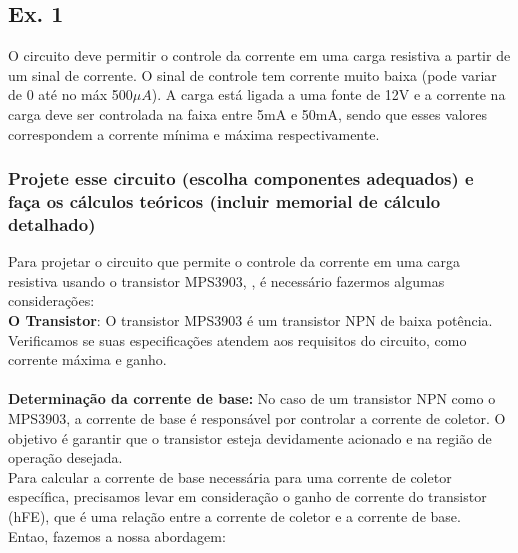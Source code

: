 \documentclass[a4paper, 12pt]{article}
\begin{document}
\subsection{Ex. 1}
O circuito deve permitir o controle da corrente em uma carga resistiva a partir de um sinal de  corrente. O sinal de controle tem corrente muito baixa (pode variar de 0 até no máx 500$\mu A$). A carga está ligada a uma fonte de 12V e a corrente na carga deve ser controlada na faixa entre 5mA e 50mA, sendo que esses valores correspondem a corrente mínima e máxima respectivamente. 

\subsubsection{Projete esse circuito (escolha componentes adequados) e faça os cálculos teóricos (incluir memorial de cálculo detalhado)}

Para projetar o circuito que permite o controle da corrente em uma carga resistiva usando o transistor MPS3903, , é necessário fazermos algumas considerações:\\

\textbf{O Transistor}: O transistor MPS3903 é um transistor NPN de baixa potência. Verificamos se suas especificações atendem aos requisitos do circuito, como corrente máxima e ganho.\\ \\

\textbf{Determinação da corrente de base:} No caso de um transistor NPN como o MPS3903, a corrente de base é responsável por controlar a corrente de coletor. O objetivo é garantir que o transistor esteja devidamente acionado e na região de operação desejada.\\ 

Para calcular a corrente de base necessária para uma corrente de coletor específica, precisamos levar em consideração o ganho de corrente do transistor (hFE), que é uma relação entre a corrente de coletor e a corrente de base.\\

Entao, fazemos a nossa abordagem:
\end{document}
